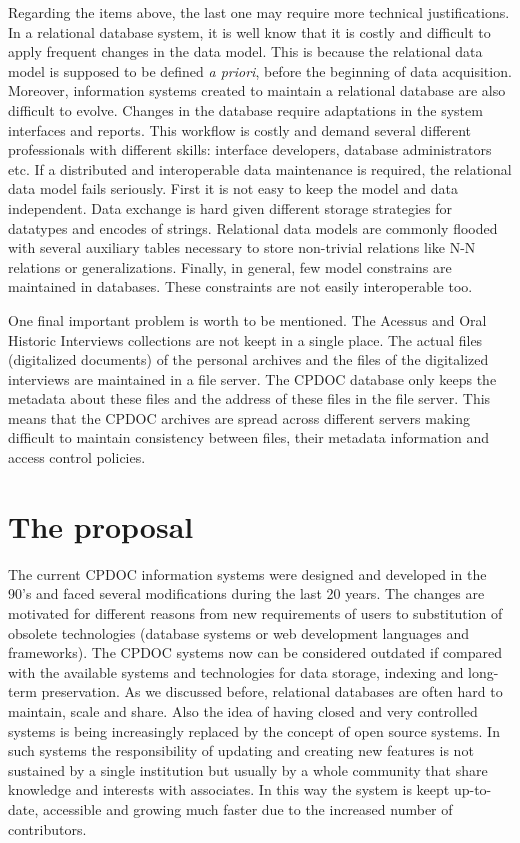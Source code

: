 \documentclass{llncs}
\begin{document}
Regarding the items above, the last one may require more technical
justifications. In a relational database system, it is well know that
it is costly and difficult to apply frequent changes in the data
model. This is because the relational data model is supposed to be
defined \emph{a priori}, before the beginning of data
acquisition. Moreover, information systems created to maintain a
relational database are also difficult to evolve. Changes in the
database require adaptations in the system interfaces and
reports. This workflow is costly and demand several different
professionals with different skills: interface developers, database
administrators etc. If a distributed and interoperable data
maintenance is required, the relational data model fails
seriously. First it is not easy to keep the model and data
independent. Data exchange is hard given different storage strategies
for datatypes and encodes of strings. Relational data models are
commonly flooded with several auxiliary tables necessary to store
non-trivial relations like N-N relations or generalizations. Finally,
in general, few model constrains are maintained in databases. These
constraints are not easily interoperable too.

One final important problem is worth to be mentioned. The Acessus and
Oral Historic Interviews collections are not keept in a single
place. The actual files (digitalized documents) of the personal
archives and the files of the digitalized interviews are maintained in
a file server. The CPDOC database only keeps the metadata about these
files and the address of these files in the file server. This means
that the CPDOC archives are spread across different servers making
difficult to maintain consistency between files, their metadata
information and access control policies.


\section{The proposal}

The current CPDOC information systems were designed and developed in
the 90's and faced several modifications during the last 20 years. The
changes are motivated for different reasons from new requirements of
users to substitution of obsolete technologies (database systems or
web development languages and frameworks). The CPDOC systems now can
be considered outdated if compared with the available systems and
technologies for data storage, indexing and long-term preservation.
As we discussed before, relational databases are often hard to
maintain, scale and share. Also the idea of having closed and very
controlled systems is being increasingly replaced by the concept of
open source systems. In such systems the responsibility of updating and
creating new features is not sustained by a single institution but
usually by a whole community that share knowledge and interests with
associates. In this way the system is keept up-to-date, accessible
and growing much faster due to the increased number of contributors.
\end{document}
